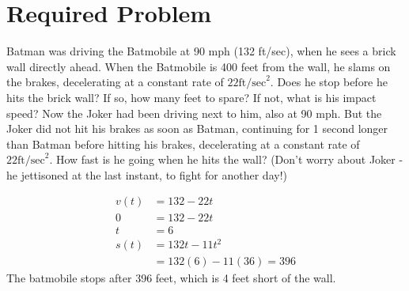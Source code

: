 \documentclass{article}
\begin{document}
\section{Required Problem}
Batman was driving the Batmobile at 90 mph (132 ft/sec), when he sees a brick wall directly ahead. When the Batmobile is 400 feet from the wall, he slams on the brakes, decelerating at a constant rate of \(22 \text{ft/sec}^2\). Does he stop before he hits the brick wall? If so, how many feet to spare? If not, what is his impact speed? Now the Joker had been driving next to him, also at 90 mph. But the Joker did not hit his brakes as soon as Batman, continuing for 1 second longer than Batman before hitting his brakes, decelerating at a constant rate of \(22 \text{ft/sec}^2\). How fast is he going when he hits the wall? (Don't worry about Joker - he jettisoned at the last instant, to fight for another day!)

$$\begin{align}
	v(t)&=132-22t\\
	0&=132-22t\\
	t&=6\\
	s(t)&=132t-11t^2\\
	&= 132(6)-11(36) = 396
\end{align}$$
The batmobile stops after 396 feet, which is 4 feet short of the wall.
\end{document}
